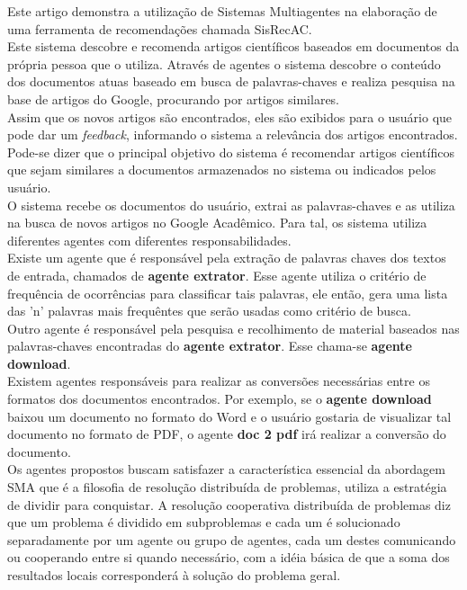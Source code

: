 \documentclass[11pt]{article}
\begin{document}
  Este artigo demonstra a utilização de Sistemas Multiagentes na 
  elaboração de uma ferramenta de recomendações chamada SisRecAC.
  \\

  Este sistema descobre e recomenda artigos científicos baseados em 
  documentos da própria pessoa que o utiliza. Através de agentes o sistema 
  descobre o conteúdo dos documentos atuas baseado em busca de 
  palavras-chaves e realiza pesquisa na base de artigos do Google, procurando
  por artigos similares.
  \\

  Assim que os novos artigos são encontrados, eles são exibidos para o 
  usuário que pode dar um {\em feedback}, informando o sistema a relevância 
  dos artigos encontrados. 
  \\

  Pode-se dizer que o principal objetivo do sistema é recomendar artigos 
  científicos que sejam similares a documentos armazenados no sistema ou 
  indicados pelos usuário.
  \\

  O sistema recebe os documentos do usuário, extrai as palavras-chaves e
  as utiliza na busca de novos artigos no Google Acadêmico. Para tal, os 
  sistema utiliza diferentes agentes com diferentes responsabilidades. 
  \\

  Existe um agente que é responsável pela extração de palavras chaves dos textos de entrada, 
  chamados de {\bf agente extrator}. Esse agente utiliza o critério de frequência 
  de ocorrências para classificar tais palavras, ele então, gera uma lista 
  das 'n' palavras mais frequêntes que serão usadas como critério de busca.
  \\

  Outro agente é responsável pela pesquisa e recolhimento de material baseados
  nas palavras-chaves encontradas do {\bf agente extrator}. Esse chama-se {\bf agente download}.
  \\

  Existem agentes responsáveis para realizar as conversões necessárias entre os 
  formatos dos documentos encontrados. Por exemplo, se o {\bf agente download} baixou um
  documento no formato do Word e o usuário gostaria de visualizar tal documento no formato
  de PDF, o agente {\bf doc 2 pdf} irá realizar a conversão do documento.
  \\

  Os agentes propostos buscam satisfazer a característica essencial da abordagem SMA que é
  a filosofia de resolução distribuída de problemas, utiliza a estratégia de dividir para
  conquistar. A resolução cooperativa distribuída de problemas diz que um problema é
  dividido em subproblemas e cada um é solucionado separadamente por um agente ou grupo
  de agentes, cada um destes comunicando ou cooperando entre si quando necessário, com a
  idéia básica de que a soma dos resultados locais corresponderá à solução do problema geral. 
  \\
\end{document}
